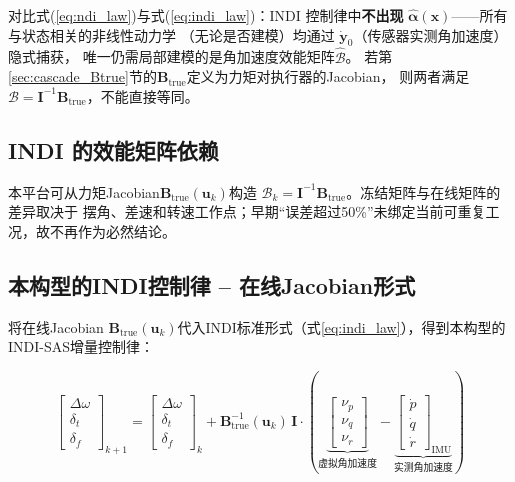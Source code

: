 对比式(\ref{eq:ndi_law})与式(\ref{eq:indi_law})：INDI 控制律中\textbf{不出现}
$\hat{\boldsymbol{\alpha}}(\mathbf{x})$——所有与状态相关的非线性动力学
（无论是否建模）均通过 $\dot{\mathbf{y}}_0$（传感器实测角加速度）隐式捕获，
唯一仍需局部建模的是角加速度效能矩阵$\hat{\mathcal B}$。
若第\ref{sec:cascade_Btrue}节的$\mathbf B_{\mathrm{true}}$定义为力矩对执行器的Jacobian，
则两者满足$\mathcal B=\mathbf I^{-1}\mathbf B_{\mathrm{true}}$，不能直接等同。

\subsection{INDI 的效能矩阵依赖}

本平台可从力矩Jacobian$\mathbf B_{\mathrm{true}}(\mathbf u_k)$构造
$\mathcal B_k=\mathbf I^{-1}\mathbf B_{\mathrm{true}}$。冻结矩阵与在线矩阵的差异取决于
摆角、差速和转速工作点；早期“误差超过50\%”未绑定当前可重复工况，故不再作为必然结论。

\subsection{本构型的INDI控制律 -- 在线Jacobian形式}

将在线Jacobian $\mathbf{B}_{\mathrm{true}}(\mathbf{u}_k)$代入INDI标准形式（式\ref{eq:indi_law}），得到本构型的INDI-SAS增量控制律：

\begin{equation}
    \boxed{
    \begin{bmatrix} \Delta\omega \\ \delta_t \\ \delta_f \end{bmatrix}_{k+1}
    =
    \begin{bmatrix} \Delta\omega \\ \delta_t \\ \delta_f \end{bmatrix}_{k}
    +
    \mathbf{B}_{\mathrm{true}}^{-1}(\mathbf{u}_k)\,\mathbf I
    \cdot
    \left(
    \underbrace{\begin{bmatrix} \nu_p \\ \nu_q \\ \nu_r \end{bmatrix}}_{\text{虚拟角加速度}}
    -
    \underbrace{\begin{bmatrix} \dot{p} \\ \dot{q} \\ \dot{r} \end{bmatrix}_{\text{IMU}}}_{\text{实测角加速度}}
    \right)
    }
    \label{eq:indi_our_config}
\end{equation}

